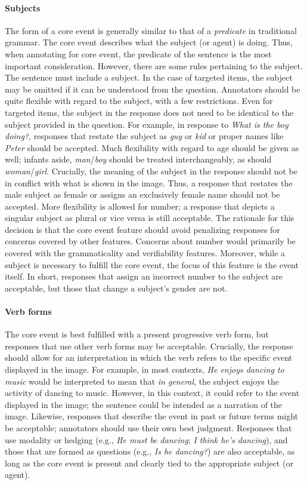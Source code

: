 \documentclass[12pt]{article}
\begin{document}
\paragraph{Subjects} \label{para:core-event-subjects} The form of a core event is generally similar to that of a \textit{predicate} in traditional grammar. The core event describes what the subject (or agent) is doing. Thus, when annotating for core event, the predicate of the sentence is the most important consideration. However, there are some rules pertaining to the subject. The sentence must include a subject. In the case of targeted items, the subject may be omitted if it can be understood from the question. Annotators should be quite flexible with regard to the subject, with a few restrictions. Even for targeted items, the subject in the response does not need to be identical to the subject provided in the question. For example, in response to \textit{What is the boy doing?}, responses that restate the subject as \textit{guy} or \textit{kid} or proper names like \textit{Peter} should be accepted. Much flexibility with regard to age should be given as well; infants aside, \textit{man}/\textit{boy} should be treated interchangeably, as should \textit{woman}/\textit{girl}. Crucially, the meaning of the subject in the response should not be in conflict with what is shown in the image. Thus, a response that restates the male subject as female or assigns an exclusively female name should not be accepted. More flexibility is allowed for number; a response that depicts a singular subject as plural or vice versa is still acceptable. The rationale for this decision is that the core event feature should avoid penalizing responses for concerns covered by other features. Concerns about number would primarily be covered with the grammaticality and verifiability features. Moreover, while a subject is necessary to fulfill the core event, the focus of this feature is the event itself. In short, responses that assign an incorrect number to the subject  are acceptable, but those that change a subject's gender are not.

\paragraph{Verb forms}
The core event is best fulfilled with a present progressive verb form, but responses that use other verb forms may be acceptable. Crucially, the response should allow for an interpretation in which the verb refers to the specific event displayed in the image. For example, in most contexts, \textit{He enjoys dancing to music} would be interpreted to mean that \textit{in general}, the subject enjoys the activity of dancing to music. However, in this context, it could refer to the event displayed in the image; the sentence could be intended as a narration of the image. Likewise, responses that describe the event in past or future terms might be acceptable; annotators should use their own best judgment. Responses that use modality or hedging (e.g., \textit{He must be dancing}; \textit{I think he's dancing}), and those that are formed as questions (e.g., \textit{Is he dancing?}) are also acceptable, as long as the core event is present and clearly tied to the appropriate subject (or agent).
\end{document}
